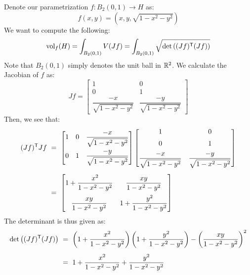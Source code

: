 \begin{pf}
    Denote our parametrization $ f: B_{2}(0, 1) \rightarrow H $ as:
    \begin{equation*}
        f(x, y) = (x, y, \sqrt{1 - x^{2} - y^{2}})
    \end{equation*}
    We want to compute the following:
    \begin{equation*}
        \textrm{vol}_{f}(H) = \int_{B_{2}(0, 1)}V(Jf)
        = \int_{B_{2}(0, 1)}\sqrt{\det\left((Jf)^{\mathsf{T}}(Jf)\right)}
    \end{equation*}
    Note that $ B_{2}(0, 1) $ simply denotes the unit ball in $ \mathbb{R}^{2} $.
    We calculate the Jacobian of $ f $ as:
    \begin{equation*}
        Jf =
        \begin{bmatrix}
            1 & 0 \\
            0 & 1 \\
            \dfrac{-x}{\sqrt{1-x^{2}-y^{2}}} & \dfrac{-y}{\sqrt{1-x^{2}-y^{2}}}
        \end{bmatrix}
    \end{equation*}
    Then, we see that:
    \begin{align*}
        (Jf)^{\msf{T}}Jf & \ = \
        \begin{bmatrix}
            1 & 0 & \dfrac{-x}{\sqrt{1-x^{2}-y^{2}}} \\[0.15in]
            0 & 1 & \dfrac{-y}{\sqrt{1-x^{2}-y^{2}}}
        \end{bmatrix}
        \begin{bmatrix}
            1 & 0 \vsp
            0 & 1 \vsp
            \dfrac{-x}{\sqrt{1-x^{2}-y^{2}}} & \dfrac{-y}{\sqrt{1-x^{2}-y^{2}}}
        \end{bmatrix} \vsp
                         & \ = \
        \begin{bmatrix}
            1 + \dfrac{x^{2}}{1-x^{2}-y^{2}} & \dfrac{xy}{1-x^{2}-y^{2}}
            \\[0.15in]
            \dfrac{xy}{1-x^{2}-y^{2}} & 1+\dfrac{y^{2}}{1-x^{2}-y^{2}}
        \end{bmatrix}
    \end{align*}
    The determinant is thus given as:
    \begin{align*}
        \det \left( (Jf)^{\msf{T}}(Jf) \right) & \ = \
        \left( 1 + \frac{x^{2}}{1-x^{2}-y^{2}} \right)
        \left( 1 + \frac{y^{2}}{1-x^{2}-y^{2}} \right) -
        \left( \frac{xy}{1-x^{2}-y^{2}} \right)^{2} \vsp
        & \ = \
        1 + \frac{x^{2}}{1-x^{2}-y^{2}} + \frac{y^{2}}{1-x^{2}-y^{2}} \vsp

\end{align*}
\end{pf}
